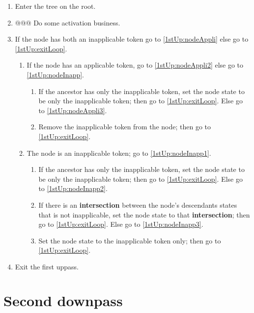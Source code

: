 \documentclass[a4paper,12pt]{article}
\begin{document}
\begin{enumerate}
    \item Enter the tree on the root.
    \item @@@ Do some activation business.
    \item If the node has both an inapplicable token go to \ref{1stUp:nodeAppli} else go to \ref{1stUp:exitLoop}.
    \begin{enumerate}
        \item \label{1stUp:nodeAppli} If the node has an applicable token, go to \ref{1stUp:nodeAppli2} else go to \ref{1stUp:nodeInapp}.
        \begin{enumerate}
            \item \label{1stUp:nodeAppli2} If the ancestor has only the inapplicable token, set the node state to be only the inapplicable token; then go to \ref{1stUp:exitLoop}. Else go to \ref{1stUp:nodeAppli3}.
            \item \label{1stUp:nodeAppli3} Remove the inapplicable token from the node; then go to \ref{1stUp:exitLoop}.
        \end{enumerate}
        \item \label{1stUp:nodeInapp} The node is an inapplicable token; go to \ref{1stUp:nodeInapp1}.
        \begin{enumerate}
            \item \label{1stUp:nodeInapp1} If the ancestor has only the inapplicable token, set the node state to be only the inapplicable token; then go to \ref{1stUp:exitLoop}. Else go to \ref{1stUp:nodeInapp2}.
            \item \label{1stUp:nodeInapp2} If there is an \textbf{intersection} between the node's descendants states that is not inapplicable, set the node state to that \textbf{intersection}; then go to \ref{1stUp:exitLoop}. Else go to \ref{1stUp:nodeInapp3}.
            \item \label{1stUp:nodeInapp3} Set the node state to the inapplicable token only; then go to \ref{1stUp:exitLoop}.
        \end{enumerate}
    \end{enumerate}
    \item \label{1stUp:exitLoop} Exit the first uppass.
\end{enumerate}

\section{Second downpass}
\end{document}
